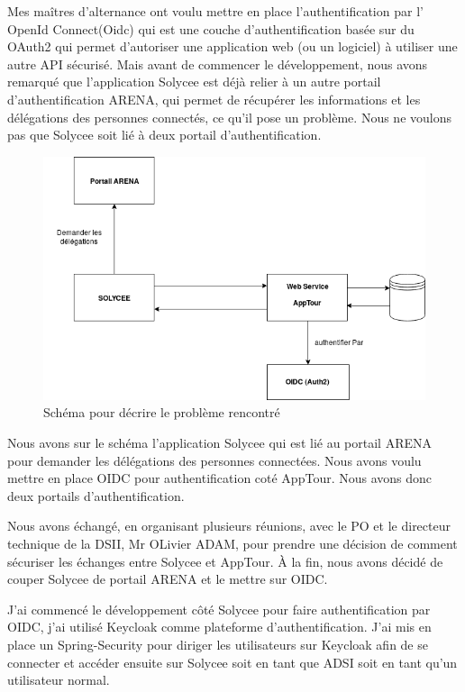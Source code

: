 \documentclass[12pt]{article}
\begin{document}
Mes maîtres d'alternance ont voulu mettre en place l'authentification par l' OpenId Connect(Oidc) qui est une couche d'authentification basée sur du OAuth2 qui permet d'autoriser une application web (ou un logiciel) à utiliser une autre API sécurisé. Mais avant de commencer le développement, nous avons remarqué que l'application Solycee est déjà relier à un autre portail d'authentification ARENA, qui permet de récupérer les informations et les délégations des personnes connectés, ce qu'il pose un problème. Nous ne voulons pas que Solycee soit lié à deux portail d'authentification.

\begin{figure}[H]
	\centering
 		\includegraphics[width=1\textwidth]{diagrammes/schemaOIDC.png}
  		\caption{Schéma pour décrire le problème rencontré}\end{figure}	

Nous avons sur le schéma l'application Solycee qui est lié au portail ARENA pour demander les délégations des personnes connectées. Nous avons voulu mettre en place OIDC pour authentification coté AppTour. Nous avons donc deux portails d'authentification. 


Nous avons échangé, en organisant plusieurs réunions, avec le PO et le directeur technique de la DSII, Mr OLivier ADAM, pour prendre une décision de comment sécuriser les échanges entre  Solycee et AppTour. À la fin, nous avons décidé de couper Solycee de portail ARENA et le mettre sur OIDC. 

J'ai commencé le développement côté Solycee pour faire authentification par OIDC, j'ai utilisé Keycloak comme plateforme d'authentification. J'ai mis en place un Spring-Security pour diriger les utilisateurs sur Keycloak afin de se connecter et accéder ensuite sur Solycee soit en tant que ADSI soit en tant qu'un utilisateur normal. 
\end{document}
